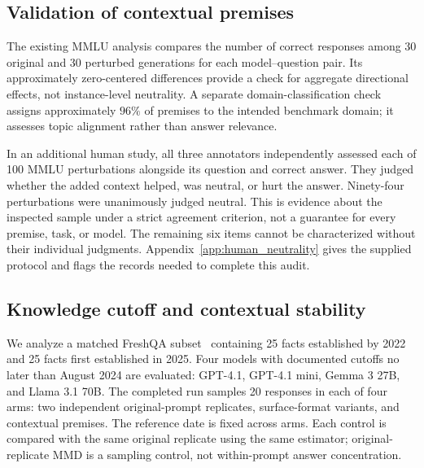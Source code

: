 \documentclass[11pt]{article}
\theoremstyle{plain}
\theoremstyle{definition}
\theoremstyle{remark}
\newif\ifrevisionmarkup
\DeclareRobustCommand{\revisioncolor}{\ifrevisionmarkup\color{red}\fi}
\newenvironment{revision}{\par\begingroup\revisioncolor}{\par\endgroup}
\begin{document}
\begin{revision}
\subsection{Validation of contextual premises}
\label{sec:neutrality}
The existing MMLU analysis compares the number of correct responses among 30 original and 30 perturbed generations for each model--question pair. Its approximately zero-centered differences provide a check for aggregate directional effects, not instance-level neutrality. A separate domain-classification check assigns approximately $96\%$ of premises to the intended benchmark domain; it assesses topic alignment rather than answer relevance.

In an additional human study, all three annotators independently assessed each of 100 MMLU perturbations alongside its question and correct answer. They judged whether the added context helped, was neutral, or hurt the answer. Ninety-four perturbations were unanimously judged neutral. This is evidence about the inspected sample under a strict agreement criterion, not a guarantee for every premise, task, or model. The remaining six items cannot be characterized without their individual judgments. Appendix~\ref{app:human_neutrality} gives the supplied protocol and flags the records needed to complete this audit.
\end{revision}

\begin{revision}
\subsection{Knowledge cutoff and contextual stability}
\label{sec:cutoff}
We analyze a matched FreshQA subset~\citep{vu-etal-2024-freshllms} containing 25 facts established by 2022 and 25 facts first established in 2025. Four models with documented cutoffs no later than August 2024 are evaluated: GPT-4.1, GPT-4.1 mini, Gemma 3 27B, and Llama 3.1 70B. The completed run samples 20 responses in each of four arms: two independent original-prompt replicates, surface-format variants, and contextual premises. The reference date is fixed across arms. Each control is compared with the same original replicate using the same estimator; original-replicate MMD is a sampling control, not within-prompt answer concentration.
\end{revision}
\end{document}
